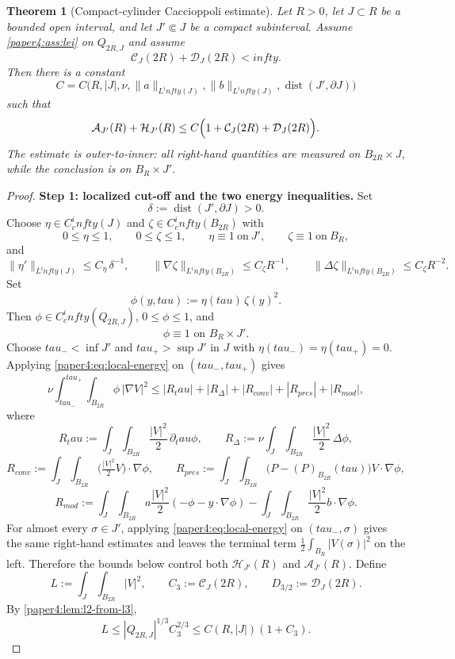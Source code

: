 \documentclass[11pt]{amsart}
\def\mathrm#1{#1}%
\def\mathbb#1{#1}%
\def\tau{tau}%
\def\infty{infty}%
\theoremstyle{plain}
\newtheorem{theorem}{Theorem}[section]
\theoremstyle{definition}
\theoremstyle{remark}
\begin{document}
\begin{theorem}[Compact-cylinder Caccioppoli estimate]\label{paper4:thm:caccioppoli}
Let $R>0$, let $J\subset\mathbb R$ be a bounded open interval, and let
$J'\Subset J$ be a compact subinterval. Assume
\cref{paper4:ass:lei} on $Q_{2R,J}$ and assume
\[
\mathcal C_J(2R)+\mathcal D_J(2R)<\infty.
\]
Then there is a constant
\[
C=C\bigl(R,|J|,\nu,\|a\|_{L^\infty(J)},\|b\|_{L^\infty(J)},
\operatorname{dist}(J',\partial J)\bigr)
\]
such that
\[
\mathcal A_{J'}(R)+\mathcal H_{J'}(R)
\le C\Bigl(1+
\mathcal C_J(2R)+\mathcal D_J(2R)
\Bigr).
\]
The estimate is outer-to-inner: all right-hand quantities are measured on
$B_{2R}\times J$, while the conclusion is on $B_R\times J'$.
\end{theorem}

\begin{proof}
\textbf{Step 1: localized cut-off and the two energy inequalities.}
Set
\[
\delta:=\operatorname{dist}(J',\partial J)>0.
\]
Choose $\eta\in C_c^\infty(J)$ and $\zeta\in C_c^\infty(B_{2R})$ with
\[
0\le\eta\le1,\qquad
0\le\zeta\le1,\qquad
\eta\equiv1\ \text{on}\ J',\qquad
\zeta\equiv1\ \text{on}\ B_R,
\]
and
\[
\|\eta'\|_{L^\infty(J)}\le C_\eta\,\delta^{-1},
\qquad
\|\nabla\zeta\|_{L^\infty(B_{2R})}\le C_\zeta R^{-1},
\qquad
\|\Delta\zeta\|_{L^\infty(B_{2R})}\le C_\zeta R^{-2}.
\]
Set
\[
\phi(y,\tau):=\eta(\tau)\,\zeta(y)^2.
\]
Then $\phi\in C_c^\infty(Q_{2R,J})$, $0\le\phi\le1$, and
\[
\phi\equiv1\text{ on }B_R\times J'.
\]
Choose $\tau_-<\inf J'$ and $\tau_+>\sup J'$ in $J$ with
$\eta(\tau_-)=\eta(\tau_+)=0$. Applying \eqref{paper4:eq:local-energy} on
$(\tau_-,\tau_+)$ gives
\[
\nu\int_{\tau_-}^{\tau_+}\!\int_{B_{2R}}\phi\,|\nabla V|^2
\le |R_\tau|+|R_\Delta|+|R_{\mathrm{conv}}|+|R_{\mathrm{pres}}|+|R_{\mathrm{mod}}|,
\]
where
\[
R_\tau:=\int_J\!\int_{B_{2R}}\frac{|V|^2}{2}\,\partial_\tau\phi,\qquad
R_\Delta:=\nu\int_J\!\int_{B_{2R}}\frac{|V|^2}{2}\,\Delta\phi,
\]
\[
R_{\mathrm{conv}}:=\int_J\!\int_{B_{2R}}\bigl(\tfrac{|V|^2}{2}V\bigr)\cdot\nabla\phi,\qquad
R_{\mathrm{pres}}:=\int_J\!\int_{B_{2R}}\bigl(P-(P)_{B_{2R}}(\tau)\bigr)V\cdot\nabla\phi,
\]
\[
R_{\mathrm{mod}}:=\int_J\!\int_{B_{2R}}
a\frac{|V|^2}{2}(-\phi-y\cdot\nabla\phi)
-\int_J\!\int_{B_{2R}}\frac{|V|^2}{2}b\cdot\nabla\phi.
\]
For almost every $\sigma\in J'$, applying \eqref{paper4:eq:local-energy} on
$(\tau_-,\sigma)$ gives the same right-hand estimates and leaves the terminal
term $\frac12\int_{B_R}|V(\sigma)|^2$ on the left. Therefore the bounds below
control both $\mathcal H_{J'}(R)$ and $\mathcal A_{J'}(R)$.
Define
\[
L:=\int_J\!\int_{B_{2R}}|V|^2,\qquad
C_3:=\mathcal C_J(2R),\qquad D_{3/2}:=\mathcal D_J(2R).
\]
By \cref{paper4:lem:l2-from-l3},
\[
L\le |Q_{2R,J}|^{1/3}C_3^{2/3}\le C(R,|J|)(1+C_3).
\]


\end{proof}
\end{document}
